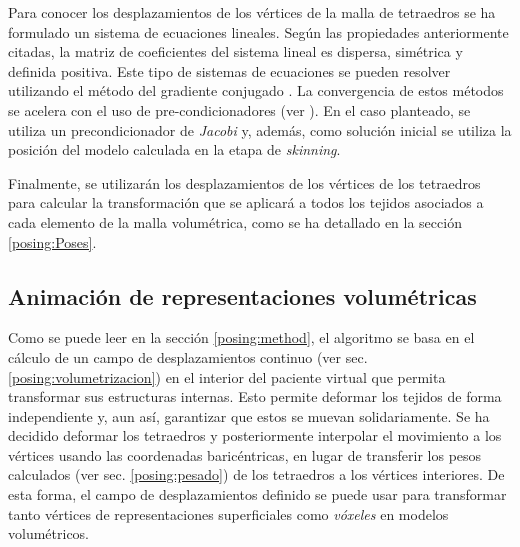 Para conocer los desplazamientos de los vértices de la malla de tetraedros se ha formulado un sistema de ecuaciones lineales. Según las propiedades anteriormente citadas, la matriz de coeficientes del sistema lineal es dispersa, simétrica y definida positiva. Este tipo de sistemas de ecuaciones se pueden resolver utilizando el método del gradiente conjugado \cite{Press2007}. La convergencia de estos métodos se acelera con el uso de pre-condicionadores (ver \cite{hauth2003}). En el caso planteado, se utiliza un precondicionador de \emph{Jacobi} y, además, como solución inicial se utiliza la posición del modelo calculada en la etapa de \emph{skinning}. %

Finalmente, se utilizarán los desplazamientos de los vértices de los tetraedros para calcular la transformación que se aplicará a todos los tejidos asociados a cada elemento de la malla volumétrica, como se ha detallado en la sección \ref{posing:Poses}.%

\subsection{Animación de representaciones volumétricas}
\label{posing:animvol}



Como se puede leer en la sección 
\ref{posing:method}, el algoritmo se basa en el cálculo de un campo de desplazamientos continuo (ver sec. \ref{posing:volumetrizacion}) %
en el interior del paciente virtual que permita transformar sus estructuras internas. Esto permite deformar los tejidos de forma independiente y, aun así, garantizar que estos se muevan solidariamente. Se ha decidido deformar los tetraedros y posteriormente interpolar el movimiento a los vértices usando las coordenadas baricéntricas, en lugar de transferir los pesos calculados (ver sec. \ref{posing:pesado}) de los tetraedros a los vértices interiores. 
De esta forma, el campo de desplazamientos definido se puede usar para transformar tanto vértices de representaciones superficiales como \emph{vóxeles} en modelos volumétricos. 


